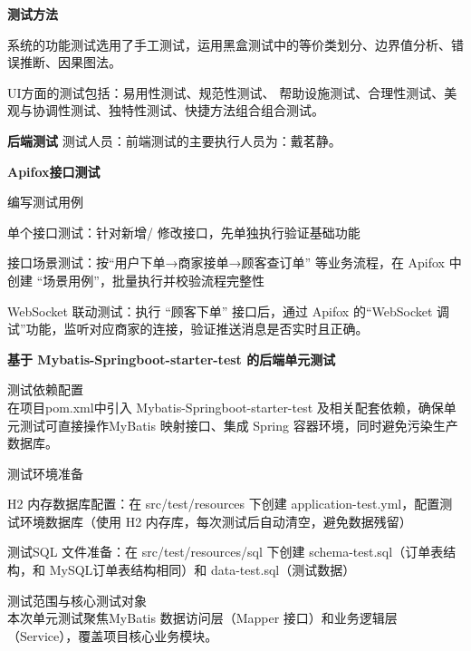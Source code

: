 \begin{levellist}
\begin{levellist}
        \item \textbf{测试方法}
        \begin{levellist}
            \item 系统的功能测试选用了手工测试，运用黑盒测试中的等价类划分、边界值分析、错误推断、因果图法。
            \item UI方面的测试包括：易用性测试、规范性测试、 帮助设施测试、合理性测试、美观与协调性测试、独特性测试、快捷方法组合组合测试。
        \end{levellist}

    \end{levellist}

    \item \textbf{后端测试}
    测试人员：前端测试的主要执行人员为：戴茗静。
    \begin{levellist}
        \item \textbf{Apifox接口测试}
        \begin{levellist}
            \item 编写测试用例
            \item 单个接口测试：针对新增/ 修改接口，先单独执行验证基础功能
            \item 接口场景测试：按“用户下单→商家接单→顾客查订单” 等业务流程，在 Apifox 中创建 “场景用例”，批量执行并校验流程完整性
            \item WebSocket 联动测试：执行 “顾客下单” 接口后，通过 Apifox 的“WebSocket 调试”功能，监听对应商家的连接，验证推送消息是否实时且正确。
        \end{levellist}

        \item \textbf{基于 Mybatis-Springboot-starter-test 的后端单元测试}
        \begin{levellist}
            \item 测试依赖配置 \\
            在项目pom.xml中引入 Mybatis-Springboot-starter-test 及相关配套依赖，确保单元测试可直接操作MyBatis 映射接口、集成 Spring 容器环境，同时避免污染生产数据库。
            \item 测试环境准备
            \begin{levellist}
                \item H2 内存数据库配置：在 src/test/resources 下创建 application-test.yml，配置测试环境数据库（使用 H2 内存库，每次测试后自动清空，避免数据残留）
                \item 测试SQL 文件准备：在 src/test/resources/sql 下创建 schema-test.sql（订单表结构，和 MySQL订单表结构相同）和 data-test.sql（测试数据）
            \end{levellist}
            \item 测试范围与核心测试对象 \\
            本次单元测试聚焦MyBatis 数据访问层（Mapper 接口）和业务逻辑层（Service），覆盖项目核心业务模块。
        \end{levellist}
    \end{levellist}



\end{levellist}

